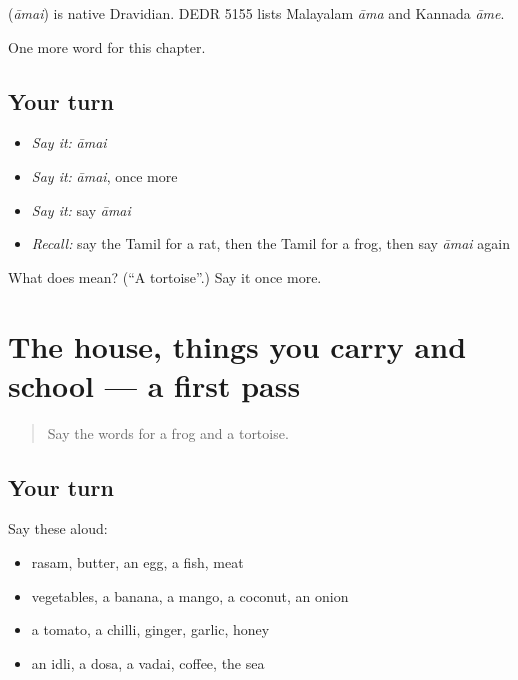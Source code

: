 \begin{cousinweb}
\textbf{} (\emph{āmai}) is native Dravidian. DEDR 5155 lists Malayalam \emph{āma} and Kannada \emph{āme}.
\end{cousinweb}

\begin{grammarlens}[title={What you've built}]
One more word for this chapter.
\end{grammarlens}

\subsection*{Your turn}
\begin{itemize}
\raggedright
  \item \emph{Say it:} \emph{āmai}
  \item \emph{Say it:} \emph{āmai}, once more
  \item \emph{Say it:} say \emph{āmai}
  \item \emph{Recall:} say the Tamil for a rat, then the Tamil for a frog, then say \emph{āmai} again
\end{itemize}

\begin{tcolorbox}[breakable,colback=teal!4,colframe=teal!35!black,title={Before you move on}]
What does  mean? (\textquotedblleft{}A tortoise\textquotedblright{}.) Say it once more.
\end{tcolorbox}
\section[(dialogue)]{The house, things you carry and school — a first pass}

\label{lesson:TA-R130-first-pass-the-house-things-you-carry-and-school}



\begin{quote}
Say the words for a frog and a tortoise.
\end{quote}

\subsection*{Your turn}
Say these aloud:

\begin{itemize}
\raggedright
  \item rasam, butter, an egg, a fish, meat
  \item vegetables, a banana, a mango, a coconut, an onion
  \item a tomato, a chilli, ginger, garlic, honey
  \item an idli, a dosa, a vadai, coffee, the sea
\end{itemize}

